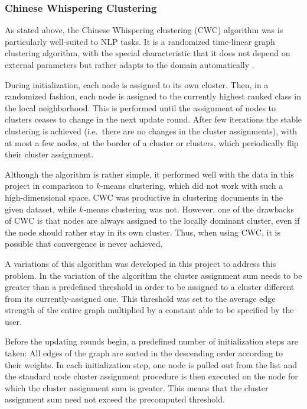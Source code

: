 \subsubsection{Chinese Whispering Clustering}
\label{sec:chinese_whipsering_clustering}
As stated above, the Chinese Whispering clustering (CWC) algorithm was is particularly well-suited to NLP tasks. It is a
randomized time-linear graph clustering algorithm, with the special characteristic that it does not depend
on external parameters but rather adapts to the domain automatically \cite{cw_clustering}.

During initialization, each node is assigned to its own cluster. Then, in a randomized
fashion, each node is assigned to the currently highest ranked class in the local neighborhood. This is performed until the assignment of nodes to clusters ceases to change in the next update round. After few iterations the stable clustering is achieved (i.e.\ there are no changes in the cluster
assignments), with at most a few nodes, at the border of a cluster or clusters, which periodically flip their
cluster assignment.

Although the algorithm is rather simple, it performed well with the data in this project in comparison to $k$-means clustering, which did not work with such a high-dimensional space. CWC was productive in clustering documents in the given dataset, while $k$-means clustering was not. However, one of the drawbacks of CWC is that nodes are always assigned to the locally dominant cluster, even if the node should rather stay in its own cluster. Thus, when using CWC, it is possible that convergence is never achieved.

A variations of this algorithm was developed in this project to address this problem.
In the variation of the algorithm the cluster assignment sum needs to be greater than a predefined threshold in order to be assigned to a cluster different from its currently-assigned one. This threshold was set to the average edge strength of the entire graph multiplied by a constant able to be specified by the user.

Before the updating rounds begin, a predefined number of initialization steps are taken: All edges of the graph are sorted in the descending order according to
their weights. In each initialization step, one node is pulled out from the list and the standard
node cluster assignment procedure is then executed on the node for which the cluster assignment sum
is greater. This means that the cluster assignment sum need not exceed the precomputed threshold.

